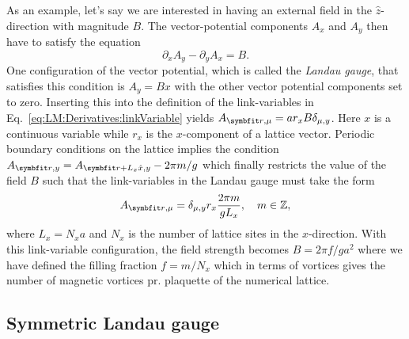 As an example, let's say we are interested in having an external field in the $\hat{z}$-direction with magnitude $B$. The vector-potential components $A_x$ and $A_y$ then have to satisfy
the equation
\begin{equation}
    \label{eq:LM:Field:vectorPotentialCondition}
    \partial_xA_y - \partial_yA_x = B.
\end{equation}
One configuration of the vector potential, which is called the \emph{Landau gauge}, that satisfies this condition is $A_y = Bx$ with the other vector potential components set to zero. Inserting
this into the definition of the link-variables in Eq.~\eqref{eq:LM:Derivatives:linkVariable} yields $A_{\v{r},\mu} = ar_xB\delta_{\mu,y}$. Here $x$ is a continuous variable while
$r_x$ is the $x$-component of a lattice vector. Periodic boundary conditions on the lattice implies the condition $A_{\v{r},y} = A_{\v{r}+L_x\hat{x},y} - 2\pi m/g$
which finally restricts the value of the field $B$ such that the link-variables in the Landau
gauge must take the form
\begin{equation}
    \label{eq:LM:Field:LandauGauge}
    A_{\v{r},\mu} = \delta_{\mu,y}r_x\frac{2\pi m}{gL_x},\quad m\in\mathbb{Z},
\end{equation}
where $L_x=N_xa$ and $N_x$ is the number of lattice sites in the $x$-direction. With this link-variable configuration, the field strength becomes $B = 2\pi f/ga^2$ where we have defined
the filling fraction $f=m/N_x$ which in terms of vortices gives the number of magnetic vortices pr. plaquette of the numerical lattice.

\subsection{Symmetric Landau gauge}
\label{sec:LM:Field:SymmLandauGauge}

